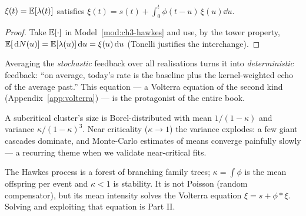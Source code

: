 \begin{proposition}\label{prop:ch3-mean}
$\xi(t)=\mathbb{E}[\lambda(t)]$ satisfies
$\xi(t)=s(t)+\int_0^t\phi(t-u)\,\xi(u)\dd u$.
\end{proposition}
\begin{proof}
Take $\mathbb{E}[\cdot]$ in Model~\ref{mod:ch3-hawkes} and use, by the tower property,
$\mathbb{E}[\,\mathrm{d} N(u)]=\mathbb{E}[\lambda(u)]\,\mathrm{d} u=\xi(u)\,\mathrm{d} u$ (Tonelli justifies the interchange).
\end{proof}

\begin{intuitionbox}
Averaging the \emph{stochastic} feedback over all realisations turns it into
\emph{deterministic} feedback: ``on average, today's rate is the baseline plus the
kernel-weighted echo of the average past.'' This equation --- a Volterra equation
of the second kind (Appendix~\ref{app:volterra}) --- is the protagonist of the
entire book.
\end{intuitionbox}

\begin{examplebox}
A subcritical cluster's size is Borel-distributed with mean $1/(1-\kappa)$ and
variance $\kappa/(1-\kappa)^3$. Near criticality ($\kappa\to1$) the variance
explodes: a few giant cascades dominate, and Monte-Carlo estimates of means
converge painfully slowly --- a recurring theme when we validate near-critical fits.
\end{examplebox}

\begin{recap}
The Hawkes process is a forest of branching family trees; $\kappa=\int\phi$ is the
mean offspring per event and $\kappa<1$ is stability. It is not Poisson (random
compensator), but its mean intensity solves the Volterra equation
$\xi=s+\phi*\xi$. Solving and exploiting that equation is Part II.
\end{recap}

